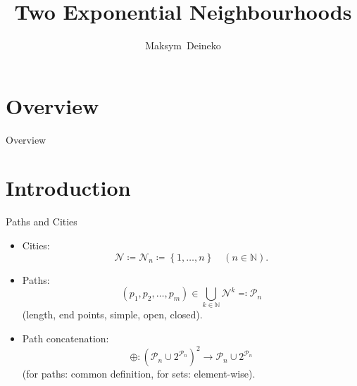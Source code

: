\documentclass[
  size=10pt,
  style=klope,
  paper=screen,
  pauseslide,
  nopagebreaks,
  fleqn
]{powerdot}
\title{Two Exponential Neighbourhoods}
\author{Maksym~Deineko \\ {\small \mailto{max.deineko@gmail.com} }}
\begin{document}
\maketitle

\section[template=wideslide,tocsection=false,slide=false]{Overview}

\begin{slide}[toc=,bm=]{Overview}
\tableofcontents[content=all,type=1]
\end{slide}

\section[template=wideslide]{Introduction}

\begin{slide}{Paths and Cities}
\begin{itemize}
  \item
  Cities:
  \begin{equation}
    \mathcal{N} \coloneqq \mathcal{N}_n \coloneqq \left\{1,\ldots,n\right\}
    \quad (n \in \mathbb{N}).
  \end{equation}%
  \item
  Paths:
  \begin{equation}
    \left(p_1,p_2,\ldots,p_m\right) \in \bigcup_{k \in \mathbb{N}}\mathcal{N}^k
    \eqqcolon \mathcal{P}_n %
  \end{equation}%
   (length, end points, simple, open, closed).
  \item
  Path concatenation:
  \begin{equation}
    \oplus: {\left( \mathcal{P}_n \cup 2^{\mathcal{P}_n} \right)}^2 \to \mathcal{P}_n \cup 2^{\mathcal{P}_n}
  \end{equation}%
  (for paths: common definition, for sets: element-wise).
\end{itemize}
\end{slide}
\end{document}
